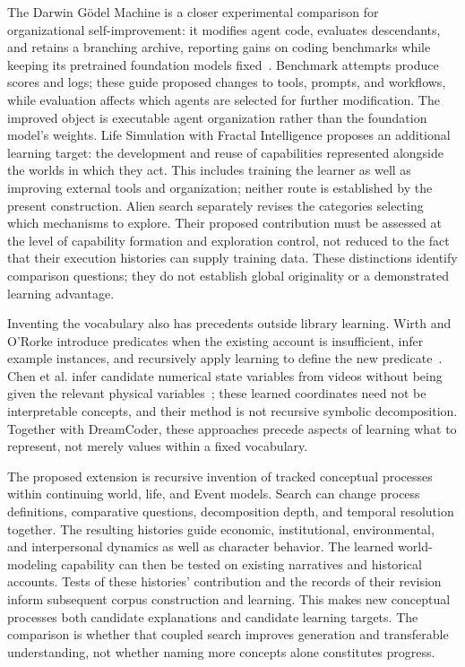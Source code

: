 \documentclass[10pt]{article}
\begin{document}
The Darwin G\"odel Machine is a closer experimental
comparison for organizational self-improvement: it modifies agent code,
evaluates descendants, and retains a branching archive, reporting gains on
coding benchmarks while keeping its pretrained foundation models
fixed~\cite{zhang2025darwinGodel}. Benchmark attempts produce scores and logs;
these guide proposed changes to tools, prompts, and workflows, while evaluation
affects which agents are selected for further modification. The improved object
is executable agent organization rather than the foundation model's weights.
Life Simulation with Fractal Intelligence
proposes an additional learning target: the development and reuse of
capabilities represented alongside the worlds in which they act. This includes
training the learner as well as improving external tools and organization;
neither route is established by the present construction.
Alien search separately revises the categories selecting
which mechanisms to explore. Their proposed contribution must be assessed at
the level of capability formation and exploration control, not reduced to the
fact that their execution histories can supply training data. These distinctions
identify comparison questions; they do not establish global originality or a
demonstrated learning advantage.

Inventing the vocabulary also has precedents outside library learning. Wirth
and O'Rorke introduce predicates when the existing account is insufficient,
infer example instances, and recursively apply learning to define the new
predicate~\cite{wirthOrorke1991predicateInvention}. Chen et al. infer candidate
numerical state variables from videos without being given the relevant
physical variables~\cite{chen2022fundamentalVariables}; these learned
coordinates need not be interpretable concepts, and their method is not
recursive symbolic decomposition. Together with DreamCoder, these approaches
precede aspects of learning what to represent, not merely values within a
fixed vocabulary.

The proposed extension is recursive invention of tracked conceptual processes
within continuing world, life, and Event models. Search can change process definitions,
comparative questions, decomposition depth, and temporal resolution together.
The resulting histories guide economic, institutional, environmental, and
interpersonal dynamics as well as character behavior. The learned
world-modeling capability can then be tested on existing narratives and
historical accounts.
Tests of these histories' contribution and the records of their revision inform
subsequent corpus construction and learning. This makes new conceptual processes both
candidate explanations and candidate learning targets. The comparison is
whether that coupled search improves generation and transferable understanding,
not whether naming more concepts alone constitutes progress.
\end{document}
